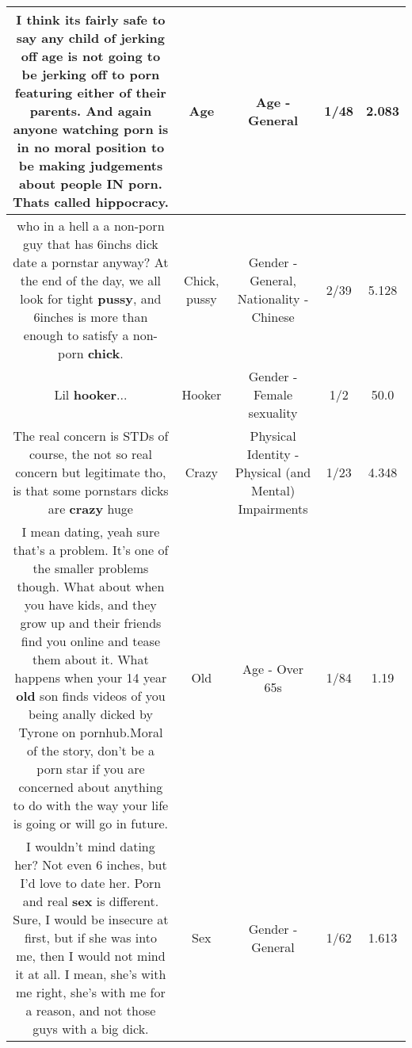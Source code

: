 \documentclass[11pt]{article}
\newlength\mylength
\begin{document}
\begin{center}
\begin{longtable}{|C{.65\mylength}|C{.30\mylength}|C{.12\mylength}|C{.12\mylength}|C{.12\mylength}|}
  \small I think its fairly safe to say any child of jerking off \textbf{age} is not going to be jerking off to porn featuring either of their parents.  And again anyone watching porn is in no moral position to be making judgements about people IN porn.  Thats called hippocracy.\normalsize   & Age & Age - General & 1/48 & 2.083 \\  \hline
  \small who in a hell a a non-porn guy that has 6inchs dick date a pornstar anyway? At the end of the day, we all look for tight \textbf{pussy}, and 6inches is more than enough to satisfy a non-porn \textbf{chick}.\normalsize   & Chick, pussy & Gender - General, Nationality - Chinese & 2/39 & 5.128 \\  \hline
  \small Lil \textbf{hooker}...\normalsize   & Hooker & Gender - Female sexuality & 1/2 & 50.0 \\  \hline
  \small The real concern is STDs of course, the not so real concern but legitimate tho, is that some pornstars dicks are \textbf{crazy} huge\normalsize   & Crazy & Physical Identity - Physical (and Mental) Impairments & 1/23 & 4.348 \\  \hline
  \small I mean dating, yeah sure that's a problem. It's one of the smaller problems though. What about when you have kids, and they grow up and their friends find you online and tease them about it. What happens when your 14 year \textbf{old} son finds videos of you being anally dicked by Tyrone on pornhub.Moral of the story, don't be a porn star if you are concerned about anything to do with the way your life is going or will go in future.\normalsize   & Old & Age - Over 65s & 1/84 & 1.19 \\  \hline
  \small I wouldn't mind dating her? Not even 6 inches, but I'd love to date her. Porn and real \textbf{sex} is different. Sure, I would be insecure at first, but if she was into me, then I would not mind it at all. I mean, she's with me right, she's with me for a reason, and not those guys with a big dick.\normalsize   & Sex & Gender - General & 1/62 & 1.613 \\  \hline

\end{longtable}
\end{center}
\end{document}
